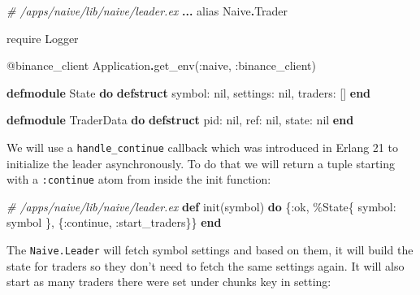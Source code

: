 \documentclass[
]{book}
\newenvironment{Shaded}{\begin{snugshade}}{\end{snugshade}}
\newcommand{\CommentTok}[1]{\textcolor[rgb]{0.56,0.35,0.01}{\textit{#1}}}
\newcommand{\ConstantTok}[1]{\textcolor[rgb]{0.00,0.00,0.00}{#1}}
\newcommand{\ImportTok}[1]{#1}
\newcommand{\KeywordTok}[1]{\textcolor[rgb]{0.13,0.29,0.53}{\textbf{#1}}}
\newcommand{\NormalTok}[1]{#1}
\newcommand{\OperatorTok}[1]{\textcolor[rgb]{0.81,0.36,0.00}{\textbf{#1}}}
\newcommand{\OtherTok}[1]{\textcolor[rgb]{0.56,0.35,0.01}{#1}}
\newcommand{\VariableTok}[1]{\textcolor[rgb]{0.00,0.00,0.00}{#1}}
\begin{document}
\begin{Shaded}
\begin{Highlighting}[]
\CommentTok{\# /apps/naive/lib/naive/leader.ex}
  \OperatorTok{...}
  \ImportTok{alias} \ConstantTok{Naive}\OperatorTok{.}\ConstantTok{Trader}

  \ImportTok{require} \ConstantTok{Logger}

  \OtherTok{@binance\_client} \ConstantTok{Application}\OperatorTok{.}\NormalTok{get\_env(}\VariableTok{:naive}\NormalTok{, }\VariableTok{:binance\_client}\NormalTok{)}

  \KeywordTok{defmodule} \ConstantTok{State} \KeywordTok{do}
    \KeywordTok{defstruct} \VariableTok{symbol:} \ConstantTok{nil}\NormalTok{,}
              \VariableTok{settings:} \ConstantTok{nil}\NormalTok{,}
              \VariableTok{traders:}\NormalTok{ []}
  \KeywordTok{end}

  \KeywordTok{defmodule} \ConstantTok{TraderData} \KeywordTok{do}
    \KeywordTok{defstruct} \VariableTok{pid:} \ConstantTok{nil}\NormalTok{,}
              \VariableTok{ref:} \ConstantTok{nil}\NormalTok{,}
              \VariableTok{state:} \ConstantTok{nil}
  \KeywordTok{end}
\end{Highlighting}
\end{Shaded}

We will use a \texttt{handle\_continue} callback which was introduced in Erlang 21 to
initialize the leader asynchronously. To do that we will return a tuple starting with a \texttt{:continue} atom from inside the init function:

\begin{Shaded}
\begin{Highlighting}[]
  \CommentTok{\# /apps/naive/lib/naive/leader.ex}
  \KeywordTok{def}\NormalTok{ init(symbol) }\KeywordTok{do}
\NormalTok{    \{}\VariableTok{:ok}\NormalTok{,}
\NormalTok{      \%}\ConstantTok{State}\NormalTok{\{}
          \VariableTok{symbol:}\NormalTok{ symbol}
\NormalTok{      \}, \{}\VariableTok{:continue}\NormalTok{, }\VariableTok{:start\_traders}\NormalTok{\}\}}
  \KeywordTok{end}
\end{Highlighting}
\end{Shaded}

The \texttt{Naive.Leader} will fetch symbol settings and based on them, it will build the state for traders so they don't need to fetch the same settings again. It will also start as many traders there were set under chunks key in setting:
\end{document}
